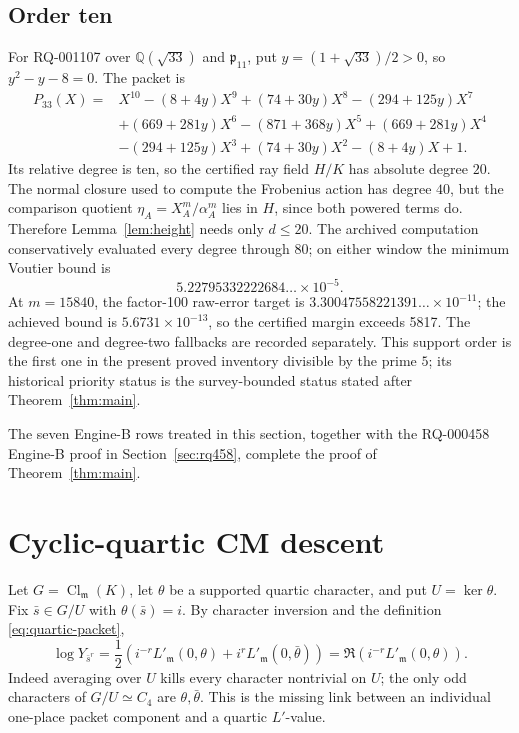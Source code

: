 \documentclass[11pt]{article}
\newcommand{\Q}{\mathbb Q}
\newcommand{\Cl}{\operatorname{Cl}}
\begin{document}
\subsection{Order ten}

For RQ-001107 over \(\Q(\sqrt{33})\) and
\(\mathfrak p_{11}\), put \(y=(1+\sqrt{33})/2>0\), so
\(y^2-y-8=0\).  The packet is
\begin{equation}\label{eq:packet-q33}
\begin{aligned}
P_{33}(X)={}&X^{10}-(8+4y)X^9+(74+30y)X^8
 -(294+125y)X^7\\
&+(669+281y)X^6-(871+368y)X^5
 +(669+281y)X^4\\
&-(294+125y)X^3+(74+30y)X^2-(8+4y)X+1.
\end{aligned}
\end{equation}
Its relative degree is ten, so the certified ray field \(H/K\) has
absolute degree \(20\).  The normal closure used to compute the
Frobenius action has degree \(40\), but the comparison quotient
\(\eta_A=X_A^m/\alpha_A^m\) lies in \(H\), since both powered terms
do.  Therefore Lemma~\ref{lem:height} needs only \(d\le20\).  The
archived computation conservatively evaluated every degree through
80; on either window the minimum Voutier bound is
\[
 5.22795332222684\ldots\times10^{-5}.
\]
At \(m=15840\), the factor-100 raw-error target is
\(3.30047558221391\ldots\times10^{-11}\); the achieved bound is
\(5.6731\times10^{-13}\), so the certified margin exceeds 5817.
The degree-one and degree-two fallbacks are recorded separately.
This support order is the first one in the present proved inventory
divisible by the prime \(5\); its historical priority status is the
survey-bounded status stated after Theorem~\ref{thm:main}.

The seven Engine-B rows treated in this section, together with the
RQ-000458 Engine-B proof in Section~\ref{sec:rq458}, complete the
proof of Theorem~\ref{thm:main}.

\section{Cyclic-quartic CM descent}\label{sec:cm}

Let \(G=\Cl_{\mathfrak m}(K)\), let \(\theta\) be a supported
quartic character, and put \(U=\ker\theta\).  Fix
\(\bar s\in G/U\) with \(\theta(\bar s)=i\).  By character inversion
and the definition \eqref{eq:quartic-packet},
\begin{equation}\label{eq:quartic-fourier}
 \log Y_{\bar s^r}
 =\frac12\left(
   i^{-r}L'_{\mathfrak m}(0,\theta)
  +i^rL'_{\mathfrak m}(0,\bar\theta)\right)
 =\Re\!\left(i^{-r}L'_{\mathfrak m}(0,\theta)\right).
\end{equation}
Indeed averaging over \(U\) kills every character nontrivial on
\(U\); the only odd characters of \(G/U\simeq C_4\) are
\(\theta,\bar\theta\).  This is the missing link between an individual
one-place packet component and a quartic \(L'\)-value.
\end{document}
